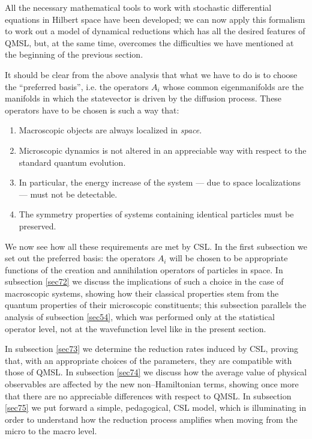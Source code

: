 \documentclass[12pt]{article}
\begin{document}
All the necessary mathematical tools to work with stochastic
differential equations in Hilbert space have been developed; we
can now apply this formalism to work out a model of dynamical
reductions which has all the desired features of QMSL, but, at the
same time, overcomes the difficulties we have mentioned at the
beginning of the previous section.

It should be clear from the above analysis that what we have to do
is to choose the ``preferred basis'', i.e. the operators $A_{i}$
whose common eigenmanifolds are the manifolds in which the
statevector is driven by the diffusion process. These operators
have to be chosen is such a way that:
\begin{enumerate}
\item Macroscopic objects are always localized in {\it space}.
\item Microscopic dynamics is not altered in an appreciable way
with respect to the standard quantum evolution.
\item In particular, the energy increase of the system --- due to
space localizations --- must not be detectable.
\item The symmetry properties of systems containing identical
particles must be preserved.
\end{enumerate}
We now see how all these requirements are met by CSL. In the first
subsection we set out the preferred basis: the operators $A_{i}$
will be chosen to be appropriate functions of the creation and
annihilation operators of particles in space. In subsection
\ref{sec72} we discuss the implications of such a choice in the
case of macroscopic systems, showing how their classical
properties stem from the quantum properties of their microscopic
constituents; this subsection parallels the analysis of subsection
\ref{sec54}, which was performed only at the statistical operator
level, not at the wavefunction level like in the present section.

In subsection \ref{sec73} we determine the reduction rates induced
by CSL, proving that, with an appropriate choices of the
parameters, they are compatible with those of QMSL. In subsection
\ref{sec74} we discuss how the average value of physical
observables are affected by the new non--Hamiltonian terms,
showing once more that there are no appreciable differences with
respect to QMSL. In subsection \ref{sec75} we put forward a
simple, pedagogical, CSL model, which is illuminating in order to
understand how the reduction process amplifies when moving from
the micro to the macro level.
\end{document}
